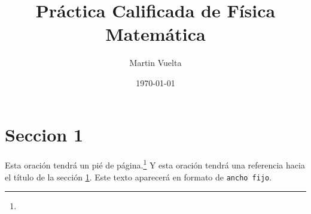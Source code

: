 \documentclass[a4paper, 12pt, final]{article}
\begin{document}
    \title{Práctica Calificada de Física Matemática}
    \author{Martin Vuelta}
    \date{\today}
    \maketitle
    
    \section{Seccion 1}\label{sec:1}
        \lipsum[1-4]
        
        Esta oración tendrá un pié de página.\footnote{\lipsum[2]} Y esta oración tendrá una referencia hacia el título de la sección  \ref{sec:1}. Este texto aparecerá en formato de \texttt{ancho fijo}.
\end{document}
